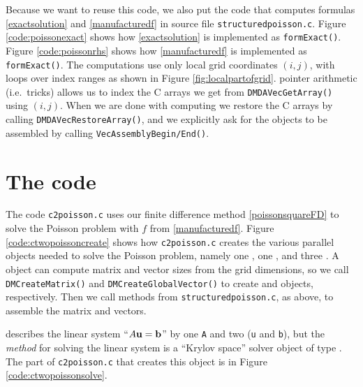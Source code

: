 
Because we want to reuse this code, we also put the code that computes formulas \eqref{exactsolution} and \eqref{manufacturedf} in source file \texttt{structuredpoisson.c}.  Figure \ref{code:poissonexact} shows how \eqref{exactsolution} is implemented as \texttt{formExact()}.  Figure \ref{code:poissonrhs} shows how \eqref{manufacturedf} is implemented as \texttt{formExact()}.  The computations use only local grid coordinates $(i,j)$, with loops over index ranges as shown in Figure \ref{fig:localpartofgrid}.  \PETSc pointer arithmetic (i.e.~tricks) allows us to index the C arrays we get from \texttt{DMDAVecGetArray()} using $(i,j)$.  When we are done with computing \pVecs we restore the C arrays by calling \texttt{DMDAVecRestoreArray()}, and we explicitly ask for the \pVec objects to be assembled by calling \texttt{VecAssemblyBegin/End()}.



\section{The code}

The code \texttt{c2poisson.c} uses our finite difference method \eqref{poissonsquareFD} to solve the Poisson problem with $f$ from \eqref{manufacturedf}.  Figure \ref{code:ctwopoissoncreate} shows how \texttt{c2poisson.c} creates the various parallel objects needed to solve the Poisson problem, namely one \pDM, one \pMat, and three \pVecs.  A \pDM object can compute matrix and vector sizes from the grid dimensions, so we call \texttt{DMCreateMatrix()} and \texttt{DMCreateGlobalVector()} to create \pMat and \pVec objects, respectively.  Then we call methods from \texttt{structuredpoisson.c}, as above, to assemble the matrix and vectors.


\PETSc describes the linear system ``$A\mathbf{u}=\mathbf{b}$'' by one \pMat \texttt{A} and two \pVecs (\texttt{u} and \texttt{b}), but the \emph{method} for solving the linear system is a ``Krylov space'' solver object of type \pKSP.  The part of \texttt{c2poisson.c} that creates this object is in Figure \ref{code:ctwopoissonsolve}.

